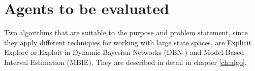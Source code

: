 \section{Agents to be evaluated}
Two algorithms that are suitable to the purpose and problem statement, since they apply different techniques for working with large state spaces, are Explicit Explore or Exploit in Dynamic Bayesian Networks (DBN-\etre) and Model Based Interval Estimation (MBIE). They are described in detail in chapter \ref{ch:algo}. 





